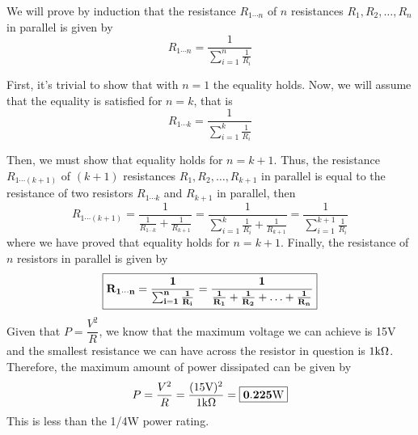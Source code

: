 \documentclass{article}
\begin{document}
    We will prove by induction that the resistance $R_{1\cdots n}$ of $n$ resistances $R_{1}, R_{2}, \ldots, R_{n}$ in parallel is given by \[R_{1\cdots n} = \dfrac{1}{\sum_{i=1}^{n}\frac{1}{R_{i}}}\]

    First, it's trivial to show that with $n = 1$ the equality holds. Now, we will assume that the equality is satisfied for $n = k$, that is
    \[R_{1\cdots k} = \dfrac{1}{\sum_{i=1}^{k}\frac{1}{R_{i}}}\]

    Then, we must show that equality holds for $n = k+1$. Thus, the resistance $R_{1\cdots (k+1)}$ of $(k+1)$ resistances $R_{1}, R_{2}, \ldots, R_{k+1}$ in parallel is equal to the resistance of two resistors $R_{1\cdots k}$ and $R_{k+1}$ in parallel, then \[R_{1\cdots (k+1)} = \frac{1}{\frac{1}{R_{1\cdots k}}+\frac{1}{R_{k+1}}} = \frac{1}{\sum_{i=1}^{k}\frac{1}{R_{i}}+\frac{1}{R_{k+1}}} = \frac{1}{\sum_{i=1}^{k+1}\frac{1}{R_{i}}}\]
    where we have proved that equality holds for $n = k+1$. Finally, the resistance of $n$ resistors in parallel is given by \[\boxed{\mathbf{R_{1\cdots n} = \dfrac{1}{\sum_{i=1}^{n}\frac{1}{R_{i}}} = \frac{1}{\frac{1}{R_{1}}+\frac{1}{R_{2}}+\ldots+\frac{1}{R_{n}}}}}\]
    Given that $P = \dfrac{V^2}{R}$, we know that the maximum voltage we can achieve is 15V and the smallest resistance we can have across the resistor in question is $1\text{k}\Omega$. Therefore, the maximum amount of power dissipated can be given by \[P = \frac{V^2}{R} = \frac{(15\text{V})^2}{1\text{k}\Omega} = \boxed{\mathbf{0.225\text{W}}}\]
    This is less than the 1/4W power rating.
\end{document}
